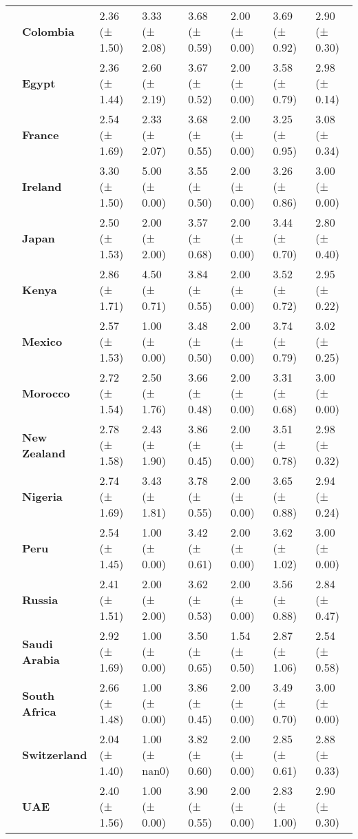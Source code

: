\begin{longtable}{llllllll}
\textbf{} & \textbf{Colombia} & 2.36 (± 1.50) & 3.33 (± 2.08) & 3.68 (± 0.59) & 2.00 (± 0.00) & 3.69 (± 0.92) & 2.90 (± 0.30) \\
\textbf{} & \textbf{Egypt} & 2.36 (± 1.44) & 2.60 (± 2.19) & 3.67 (± 0.52) & 2.00 (± 0.00) & 3.58 (± 0.79) & 2.98 (± 0.14) \\
\textbf{} & \textbf{France} & 2.54 (± 1.69) & 2.33 (± 2.07) & 3.68 (± 0.55) & 2.00 (± 0.00) & 3.25 (± 0.95) & 3.08 (± 0.34) \\
\textbf{} & \textbf{Ireland} & 3.30 (± 1.50) & 5.00 (± 0.00) & 3.55 (± 0.50) & 2.00 (± 0.00) & 3.26 (± 0.86) & 3.00 (± 0.00) \\
\textbf{} & \textbf{Japan} & 2.50 (± 1.53) & 2.00 (± 2.00) & 3.57 (± 0.68) & 2.00 (± 0.00) & 3.44 (± 0.70) & 2.80 (± 0.40) \\
\textbf{} & \textbf{Kenya} & 2.86 (± 1.71) & 4.50 (± 0.71) & 3.84 (± 0.55) & 2.00 (± 0.00) & 3.52 (± 0.72) & 2.95 (± 0.22) \\
\textbf{} & \textbf{Mexico} & 2.57 (± 1.53) & 1.00 (± 0.00) & 3.48 (± 0.50) & 2.00 (± 0.00) & 3.74 (± 0.79) & 3.02 (± 0.25) \\
\textbf{} & \textbf{Morocco} & 2.72 (± 1.54) & 2.50 (± 1.76) & 3.66 (± 0.48) & 2.00 (± 0.00) & 3.31 (± 0.68) & 3.00 (± 0.00) \\
\textbf{} & \textbf{New Zealand} & 2.78 (± 1.58) & 2.43 (± 1.90) & 3.86 (± 0.45) & 2.00 (± 0.00) & 3.51 (± 0.78) & 2.98 (± 0.32) \\
\textbf{} & \textbf{Nigeria} & 2.74 (± 1.69) & 3.43 (± 1.81) & 3.78 (± 0.55) & 2.00 (± 0.00) & 3.65 (± 0.88) & 2.94 (± 0.24) \\
\textbf{} & \textbf{Peru} & 2.54 (± 1.45) & 1.00 (± 0.00) & 3.42 (± 0.61) & 2.00 (± 0.00) & 3.62 (± 1.02) & 3.00 (± 0.00) \\
\textbf{} & \textbf{Russia} & 2.41 (± 1.51) & 2.00 (± 2.00) & 3.62 (± 0.53) & 2.00 (± 0.00) & 3.56 (± 0.88) & 2.84 (± 0.47) \\
\textbf{} & \textbf{Saudi Arabia} & 2.92 (± 1.69) & 1.00 (± 0.00) & 3.50 (± 0.65) & 1.54 (± 0.50) & 2.87 (± 1.06) & 2.54 (± 0.58) \\
\textbf{} & \textbf{South Africa} & 2.66 (± 1.48) & 1.00 (± 0.00) & 3.86 (± 0.45) & 2.00 (± 0.00) & 3.49 (± 0.70) & 3.00 (± 0.00) \\
\textbf{} & \textbf{Switzerland} & 2.04 (± 1.40) & 1.00 (± nan0) & 3.82 (± 0.60) & 2.00 (± 0.00) & 2.85 (± 0.61) & 2.88 (± 0.33) \\
\textbf{} & \textbf{UAE} & 2.40 (± 1.56) & 1.00 (± 0.00) & 3.90 (± 0.55) & 2.00 (± 0.00) & 2.83 (± 1.00) & 2.90 (± 0.30) \\

\end{longtable}
